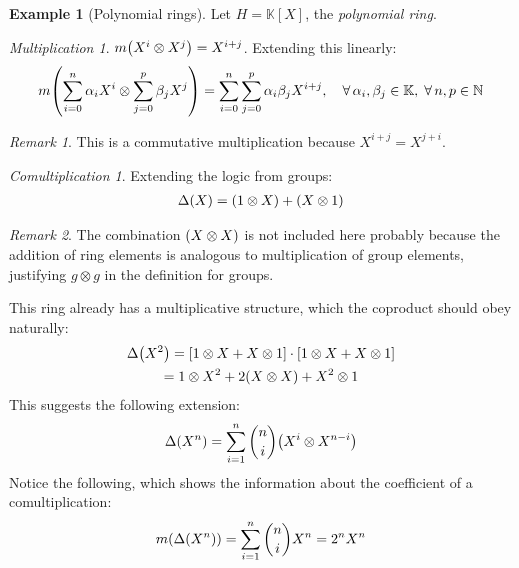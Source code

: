 \documentclass[svgnames]{article}
\theoremstyle{definition}
\newtheorem{Example}{Example}
\theoremstyle{remark}
\newtheorem*{Remark*}{Remark}
\theoremstyle{underline}
\newtheorem*{Multiplication*}{Multiplication}
\theoremstyle{underline}
\newtheorem*{Comultiplication*}{Comultiplication}
\begin{document}
	
	\begin{Example}[Polynomial rings]
		Let $H = \mathbb{K}[X]$, the \emph{polynomial ring}.
		
		\begin{Multiplication*}
			$m\pqty{X^i \otimes X^j} = X^{i+j}$. Extending this linearly:
			\begin{gather*}
			m\pqty{\sum_{i = 0}^n \alpha_i X^i \otimes \sum_{j = 0}^p \beta_j X^j} = \sum_{i = 0}^n \sum_{j = 0}^p \alpha_i \beta_j X^{i+j}, \quad \forall\,\alpha_i,\beta_j \in \mathbb K,\; \forall\,	n, p\in \mathbb N
			\end{gather*}
		\end{Multiplication*}
		
		\begin{Remark*}
			This is a commutative multiplication because $X^{i + j} = X^{j + i}$.
		\end{Remark*}
		
		\begin{Comultiplication*}
			Extending the logic from groups:
			\begin{gather*}
			\Delta\pqty{X} = \pqty{1 \otimes X} + \pqty{X \otimes 1}
			\end{gather*}
		\end{Comultiplication*}
		
		\begin{Remark*}
			The combination $\pqty{X \otimes X}$ is not included here probably because the addition of ring elements is analogous to multiplication of group elements, justifying $g \otimes g$ in the definition for groups. \\
		\end{Remark*}
		
		This ring already has a multiplicative structure, which the coproduct should obey naturally:
		\begin{gather*}
		\Delta\pqty{X^2} = \bqty{1 \otimes X + X \otimes 1} \cdot \bqty{1 \otimes X + X \otimes 1} \\
		= 1 \otimes X^2 + 2\pqty{X\otimes X} + X^2 \otimes 1 
		\end{gather*}
		This suggests the following extension:
		\begin{gather*}
		\Delta\pqty{X^{n}} = \sum_{i=1}^{n} \binom{n}{i}\pqty{X^{i} \otimes X^{n-i}} 
		\end{gather*}
		Notice the following, which shows the information about the coefficient of a comultiplication:
		\begin{gather*}
		m\pqty{\Delta\pqty{X^n}} = \sum_{i=1}^{n} \binom{n}{i}X^n =  2^nX^n
		\end{gather*}
		
	\end{Example}
	
\end{document}
